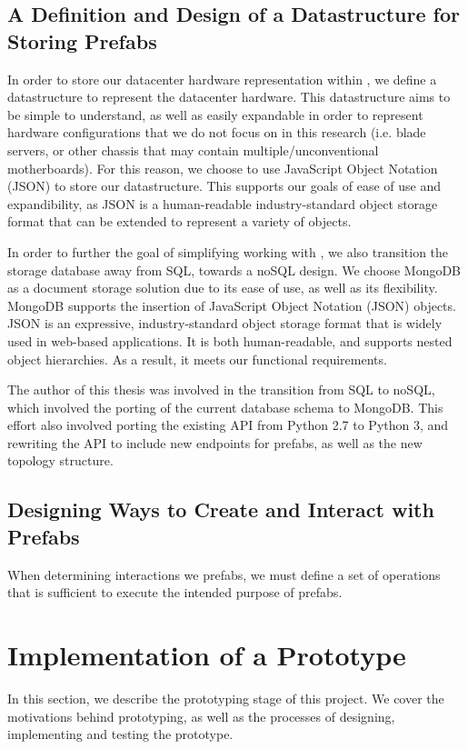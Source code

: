 \documentclass[11pt]{article}
\begin{document}
	\subsection{A Definition and Design of a Datastructure for Storing Prefabs}
		In order to store our datacenter hardware representation within \opendc{}, we define a datastructure to represent the datacenter hardware. 
		This datastructure aims to be simple to understand, as well as easily expandable in order to represent hardware configurations that we do not focus on in this research (i.e. blade servers, or other chassis that may contain multiple/unconventional motherboards). 
		For this reason, we choose to use JavaScript Object Notation (JSON) to store our datastructure. 
		This supports our goals of ease of use and expandibility, as JSON is a human-readable industry-standard object storage format that can be extended to represent a variety of objects.

		In order to further the goal of simplifying working with \opendc{}, we also transition the storage database away from SQL, towards a noSQL design.
		We choose MongoDB as a document storage solution due to its ease of use, as well as its flexibility.
		MongoDB supports the insertion of JavaScript Object Notation (JSON) objects.
		JSON is an expressive, industry-standard object storage format that is widely used in web-based applications.
		It is both human-readable, and supports nested object hierarchies.
		As a result, it meets our functional requirements.

		The author of this thesis was involved in the transition from SQL to noSQL, which involved the porting of the current database schema to MongoDB. 
		This effort also involved porting the existing \opendc{} API from Python 2.7 to Python 3, and rewriting the API to include new endpoints for prefabs, as well as the new topology structure.


	\subsection{Designing Ways to Create and Interact with Prefabs}
		When determining interactions we prefabs, we must define a set of operations that is sufficient to execute the intended purpose of prefabs.

\newpage

\section{Implementation of a Prototype} \label{sec:implementation}
	In this section, we describe the prototyping stage of this project.
	We cover the motivations behind prototyping, as well as the processes of designing, implementing and testing the prototype.
\end{document}
